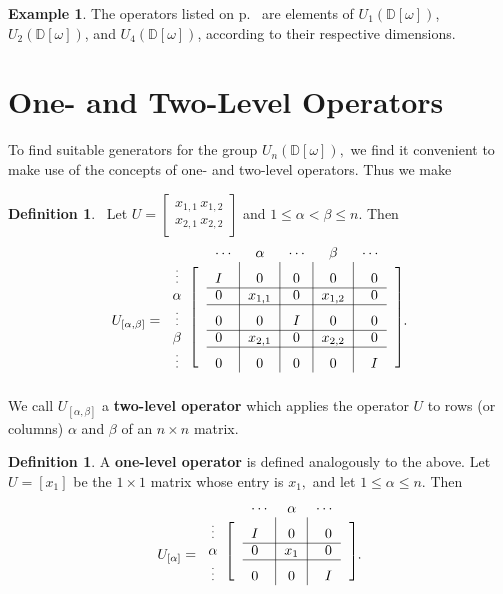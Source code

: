 \documentclass{dalthesis}
\theoremstyle{theorem}
\theoremstyle{definition}
\newtheorem{definition}[theorem]{Definition}
\theoremstyle{definition}  %
\newtheorem{example}[theorem]{Example}
\theoremstyle{definition}
\newcommand{\D}{\mathbb{D}}
\renewcommand{\:}{\mathbin{:}}
\newcommand{\matindex}[1]{{\scriptsize#1}}%
\begin{document}
\begin{example}
\label{IntroExample}
The operators listed on p.~\pageref{page-intro}
are elements of $U_1(\D[\omega])$, $U_2(\D[\omega])$, and
$U_4(\D[\omega])$, according to their respective dimensions.
\end{example}

\section{One- and Two-Level Operators}

To find suitable generators for the group $U_n(\D[\omega]),$ we find it convenient to make use of the concepts of one- and two-level operators. Thus we make

\begin{definition}~\label{2LvlDef}
Let $U = \begin{bmatrix}
x_{1,1} \, x_{1,2} \\
x_{2,1} \, x_{2,2}
\end{bmatrix}$ and $1\leq\alpha<\beta\leq n$. Then \[
U_{[\alpha,\beta]} = \raisebox{1ex}{$\begin{blockarray}{cccccccc}
  &&\matindex{\cdots}&\matindex{\alpha}&\matindex{\cdots}&\matindex{\beta}&\matindex{\cdots}& \\
  \begin{block}{c[c@{}c|c|c|c|c@{}c]}
    \matindex{\vdots}&&I&0&0&0&0 \\ \cline{3-7}
    \matindex{\alpha}&&0&x_{1,1}&0&x_{1,2}&0\\ \cline{3-7}
    \matindex{\vdots}&&0&0&I&0&0\\ \cline{3-7}
    \matindex{\beta}&&0&x_{2,1}&0&x_{2,2}&0 \\ \cline{3-7}
    \matindex{\vdots}&&0&0&0&0&I \\
  \end{block}
\end{blockarray}$}.
\]
We call $U_{[\alpha,\beta]}$ a \textbf{two-level operator} which applies the operator $U$ to rows (or columns) $\alpha$ and $\beta$ of an $n\times n$ matrix.
\end{definition}

\begin{definition}
\label{1LvlDef}
A \textbf{one-level operator} is defined analogously to the above. Let $U = \left[x_1\right]$ be the $1\times 1$ matrix whose entry is $x_1,$ and let $1\leq\alpha\leq n.$ Then \[
U_{[\alpha]} = \raisebox{1ex}{$\begin{blockarray}{cccccc}
  &&\matindex{\cdots}&\matindex{\alpha}&\matindex{\cdots}& \\
  \begin{block}{c[c@{}c|c|c@{}c]}
    \matindex{\vdots}&&I&0&0 \\ \cline{3-5}
    \matindex{\alpha}&&0&x_{1}&0\\ \cline{3-5}
    \matindex{\vdots}&&0&0&I \\
  \end{block}
\end{blockarray}$}.
\]
\end{definition}
\end{document}
